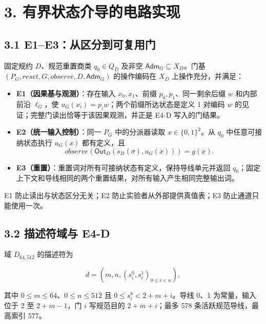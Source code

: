 \documentclass[
  11pt,
  a4paper,
]{ctexart}
\providecommand{\tightlist}{%
  \setlength{\itemsep}{0pt}\setlength{\parskip}{0pt}}
\begin{document}
\hypertarget{3-ux6709ux754cux72b6ux6001ux4ecbux5bfcux7684ux7535ux8defux5b9eux73b0}{%
\section{3.
有界状态介导的电路实现}\label{3-ux6709ux754cux72b6ux6001ux4ecbux5bfcux7684ux7535ux8defux5b9eux73b0}}

\hypertarget{31-e1e3ux4eceux533aux5206ux5230ux53efux590dux7528ux95e8}{%
\subsection{3.1
E1--E3：从区分到可复用门}\label{31-e1e3ux4eceux533aux5206ux5230ux53efux590dux7528ux95e8}}

固定规约 \(D\)、规范重置商类 \(q_0\in Q_D\) 及非空
\(\mathsf{Adm}_G\subseteq X_D\)。门基
\((P_G,\mathit{reset},G,\mathit{observe},D,\mathsf{Adm}_G)\)
的操作编码在 \(X_D\) 上操作充分，并满足：

\begin{itemize}
\tightlist
\item
  \textbf{E1（因果基与观测）}：存在输入 \(x_0,x_1\)、前缀
  \(p_0,p_1\)、同一剩余后缀 \(w\) 和内部前沿 \(\ell_G\)，使
  \(u_G(x_i)=p_iw\)；两个前缀所达状态是定义 1 对编码 \(w\)
  的见证；完整门读出恰等于该因果观测，并正是 E4-D 写入的门结果。
\item
  \textbf{E2（统一输入控制）}：同一 \(P_G\) 中的分派器读取
  \(x\in\{0,1\}^2\)。从 \(q_0\) 中任意可接纳状态执行 \(u_G(x)\)
  都有定义，且
  \[\mathit{observe}(\mathsf{Out}_D(s_D(\sigma),u_G(x)))=g(x).\]
\item
  \textbf{E3（重置）}：重置词对所有可接纳状态有定义，保持导线单元并返回
  \(q_0\)；固定上下文和导线相同的两个重置结果，对所有输入产生相同完整输出词。
\end{itemize}

E1 防止读出与状态区分无关；E2 防止实验者从外部提供真值表；E3
防止通道只能使用一次。

\hypertarget{32-ux63cfux8ff0ux7b26ux57dfux4e0e-e4-d}{%
\subsection{3.2 描述符域与
E4-D}\label{32-ux63cfux8ff0ux7b26ux57dfux4e0e-e4-d}}

域 \(D_{64,512}\) 的描述符为

\[d=(m,n,(s_i^0,s_i^1)_{0\le i<n}),\]

其中 \(0\le m\le64\)、\(0\le n\le512\) 且 \(0\le s_i^b<2+m+i\)。导线
0、1 为常量，输入位于 2 至 \(2+m-1\)，门 \(i\) 写规范目的
\(2+m+i\)；最多 578 条活跃规范导线，最高索引 577。
\end{document}
